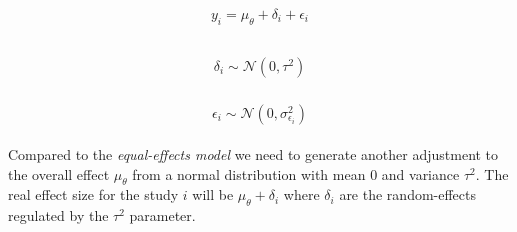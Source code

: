 \documentclass[
  man,floatsintext]{apa6}
\begin{document}
\begin{align}
\begin{aligned}
y_i = \mu_{\theta} + \delta_i + \epsilon_i \\
\label{eq:random-effects-model1}
\end{aligned}
\end{align}

\begin{align}
\begin{aligned}
\delta_i \sim \mathcal{N}(0,\tau^2)
\label{eq:random-effects-model2}
\end{aligned}
\end{align}

\begin{align}
\begin{aligned}
\epsilon_i \sim \mathcal{N}(0,\sigma_{\epsilon_i}^{2})
\label{eq:random-effects-model3}
\end{aligned}
\end{align}

Compared to the \emph{equal-effects model} we need to generate another adjustment to the overall effect \(\mu_{\theta}\) from a normal distribution with mean 0 and variance \(\tau^{2}\). The real effect size for the study \(i\) will be \(\mu_{\theta} + \delta_{i}\) where \(\delta_{i}\) are the random-effects regulated by the \(\tau^{2}\) parameter.

\scriptsize
\end{document}
